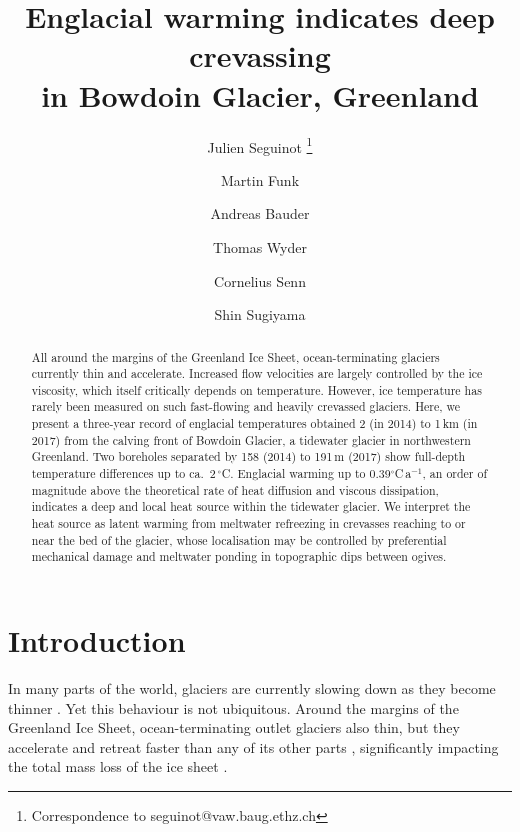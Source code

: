 \documentclass[utf8]{article}
\title{Englacial warming indicates deep crevassing\\
       in Bowdoin Glacier, Greenland}
\author[1]{Julien Seguinot
           \thanks{Correspondence to seguinot@vaw.baug.ethz.ch}}
\author[1]{Martin Funk}
\author[1]{Andreas Bauder}
\author[1]{Thomas Wyder}
\author[2]{Cornelius Senn}
\author[3]{Shin Sugiyama}
\affil[1]{Laboratory of Hydraulics, Hydrology and Glaciology,
          ETH Zürich, Switzerland}
\affil[2]{Department of Civil, Environmental and Geomatic Engineering,
          ETH Zürich, Switzerland}
\affil[3]{Institute of Low Temperature Science, Hokkaido University,
          Sapporo, Japan}
\begin{document}

\maketitle

\begin{abstract}

    All around the margins of the Greenland Ice Sheet, ocean-terminating
    glaciers currently thin and accelerate. Increased flow velocities are
    largely controlled by the ice viscosity, which itself critically depends
    on temperature. However, ice temperature has rarely
    been measured on such fast-flowing and heavily crevassed glaciers.
    Here, we present a three-year record of englacial temperatures obtained
    2 (in 2014) to 1\,km (in 2017) from the calving front of Bowdoin Glacier, a
    tidewater glacier in northwestern Greenland. Two boreholes separated by 158
    (2014) to 191\,m (2017) show full-depth
    temperature differences up to ca.~2\,$^\circ$C. Englacial warming up to
    0.39$^\circ$C\,a$^{-1}$, an order of magnitude above the theoretical rate
    of heat diffusion and viscous dissipation, indicates a deep and local heat
    source within the tidewater glacier.
    We interpret the heat source as latent warming from meltwater refreezing in
    crevasses reaching to or near the bed of the glacier, whose localisation
    may be controlled by preferential mechanical damage and meltwater ponding
    in topographic dips between ogives.

\end{abstract}

\section{Introduction}

    In many parts of the world, glaciers are currently slowing down as they
    become thinner \citep{Heid.Kaab.2012, Dehecq.etal.2018}. Yet this behaviour
    is not ubiquitous. Around the margins of
    the Greenland Ice Sheet, ocean-terminating outlet glaciers also thin, but
    they accelerate and retreat faster than any of its other parts
    \citep[e.g.,][]{Krabill.etal.2000, Rignot.Kanagaratnam.2006,
    Pritchard.etal.2009, Hill.etal.2017}, significantly impacting the total
    mass loss of the ice sheet \citep[e.g.,][]{Enderlin.etal.2014,
    Khan.etal.2015, McMillan.etal.2016}.
\end{document}
